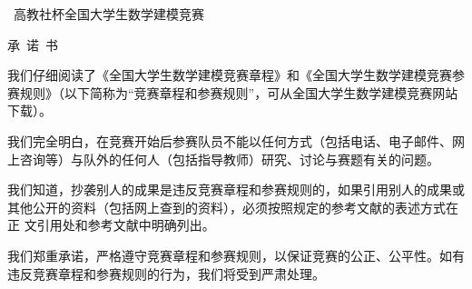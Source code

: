 \thispagestyle{empty} %
{\fontsize{14pt}{\baselineskip}\selectfont \bfseries \begin{center}{\Large\the\year}~高教社杯全国大学生数学建模竞赛\par\vspace{.5\baselineskip}\par
{\fontsize{15.75pt}{\baselineskip}\selectfont 承\  诺\  书}
\end{center}\par}
\renewcommand{\baselinestretch}{1.5}\normalsize
{%
我们仔细阅读了《全国大学生数学建模竞赛章程》和《全国大学生数学建模竞赛参赛规则》（以下简称为“竞赛章程和参赛规则”，可从全国大学生数学建模竞赛网站下载）。

我们完全明白，在竞赛开始后参赛队员不能以任何方式（包括电话、电子邮件、网上咨询等）与队外的任何人（包括指导教师）研究、讨论与赛题有关的问题。

我们知道，抄袭别人的成果是违反竞赛章程和参赛规则的，如果引用别人的成果或其他公开的资料（包括网上查到的资料），必须按照规定的参考文献的表述方式在正
文引用处和参考文献中明确列出。

我们郑重承诺，严格遵守竞赛章程和参赛规则，以保证竞赛的公正、公平性。如有违反竞赛章程和参赛规则的行为，我们将受到严肃处理。

}
